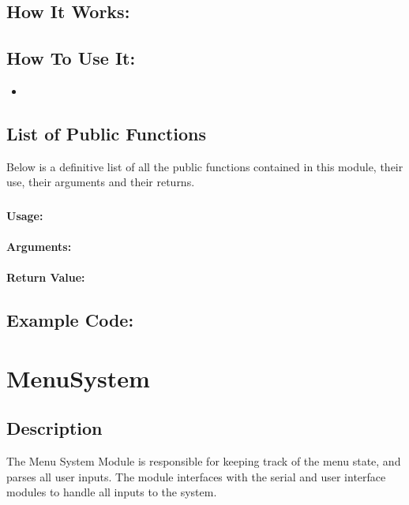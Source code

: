 \documentclass[]{report}
\begin{document}
\section{How It Works:}

\section{How To Use It:}
\begin{itemize}
	\item 
\end{itemize}

\section{List of Public Functions}
Below is a definitive list of all the public functions contained in this module, their use, their arguments and their returns.

\subsection{}
\subsubsection{Usage:}

\subsubsection{Arguments:}

\subsubsection{Return Value:}

\section{Example Code:}

\chapter{MenuSystem}
\section{Description}
The Menu System Module is responsible for keeping track of the menu state, and parses all user inputs. The module interfaces with the serial and user interface modules to handle all inputs to the system.
\end{document}
